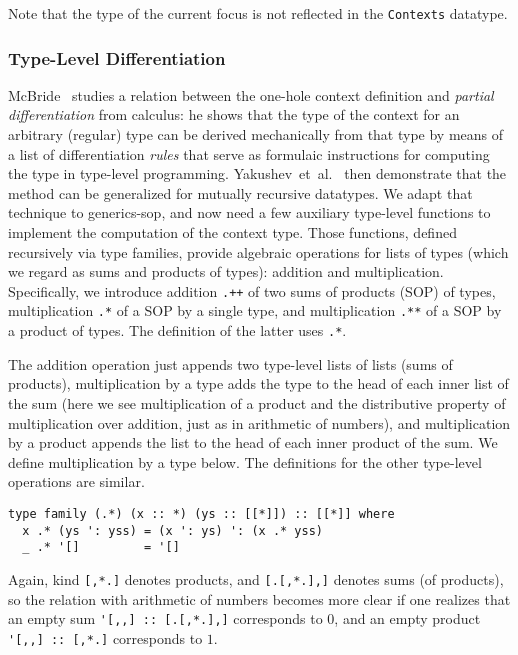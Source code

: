\documentclass[runningheads]{llncs}
\newcommand{\K}[1]{\lstinline[style=fancy]{#1}}
\begin{document}
Note that the type of the current focus is not reflected in the \K{Contexts} datatype.

\subsubsection{Type-Level Differentiation}

McBride~\cite{McBride2001} studies a relation between the one-hole context definition and \emph{partial differentiation} from calculus: he shows that the type of the context for an arbitrary (regular) type can be derived mechanically from that type by means of a list of differentiation \emph{rules} that serve as formulaic instructions for computing the type in type-level programming. Yakushev~et~al.~\cite{MuRec2009} then demonstrate that the method can be generalized for mutually recursive datatypes. We adapt that technique to \textsf{generics-sop}, and now need a few auxiliary type-level functions to implement the computation of the context type. Those functions, defined recursively via type families, provide algebraic operations for lists of types (which we regard as sums and products of types): addition and multiplication. Specifically, we introduce addition \K{.++} of two sums of products (SOP) of types, multiplication \K{.*} of a SOP by a single type, and multiplication \K{.**} of a SOP by a product of types. The definition of the latter uses \K{.*}.

The addition operation just appends two type-level lists of lists (sums of products), multiplication by a type adds the type to the head of each inner list of the sum (here we see multiplication of a product and the distributive property of multiplication over addition, just as in arithmetic of numbers), and multiplication by a product appends the list to the head of each inner product of the sum. We define multiplication by a type below. The definitions for the other type-level operations are similar.
\begin{lstlisting}[style=fancy]
type family (.*) (x :: *) (ys :: [[*]]) :: [[*]] where
  x .* (ys ': yss) = (x ': ys) ': (x .* yss)
  _ .* '[]         = '[]
\end{lstlisting}

Again, kind \K{[,*.]} denotes products, and \K{[.[,*.],]} denotes sums (of products), so the relation with arithmetic of numbers becomes more clear if one realizes that an empty sum \K{'[,,] :: [.[,*.],]} corresponds to $0$, and an empty product \K{'[,,] :: [,*.]} corresponds to $1$.
\end{document}
